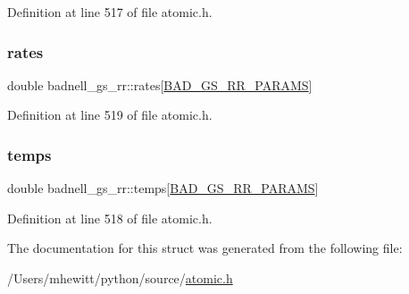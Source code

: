 Definition at line 517 of file atomic.\+h.

\mbox{\label{structbadnell__gs__rr_aa1c08814c3f5d44f7bf82291a708a138}} 
\subsubsection{\texorpdfstring{rates}{rates}}
{\footnotesize\ttfamily double badnell\+\_\+gs\+\_\+rr\+::rates\mbox{[}\hyperlink{atomic_8h_acc4d45a47ab17c4546897672a8478d52}{B\+A\+D\+\_\+\+G\+S\+\_\+\+R\+R\+\_\+\+P\+A\+R\+A\+MS}\mbox{]}}



Definition at line 519 of file atomic.\+h.

\mbox{\label{structbadnell__gs__rr_ab70f04c8e30cdc551ddc713bc7a42a6c}} 
\subsubsection{\texorpdfstring{temps}{temps}}
{\footnotesize\ttfamily double badnell\+\_\+gs\+\_\+rr\+::temps\mbox{[}\hyperlink{atomic_8h_acc4d45a47ab17c4546897672a8478d52}{B\+A\+D\+\_\+\+G\+S\+\_\+\+R\+R\+\_\+\+P\+A\+R\+A\+MS}\mbox{]}}



Definition at line 518 of file atomic.\+h.



The documentation for this struct was generated from the following file\+:\begin{DoxyCompactItemize}
\item 
/\+Users/mhewitt/python/source/\hyperlink{atomic_8h}{atomic.\+h}\end{DoxyCompactItemize}
